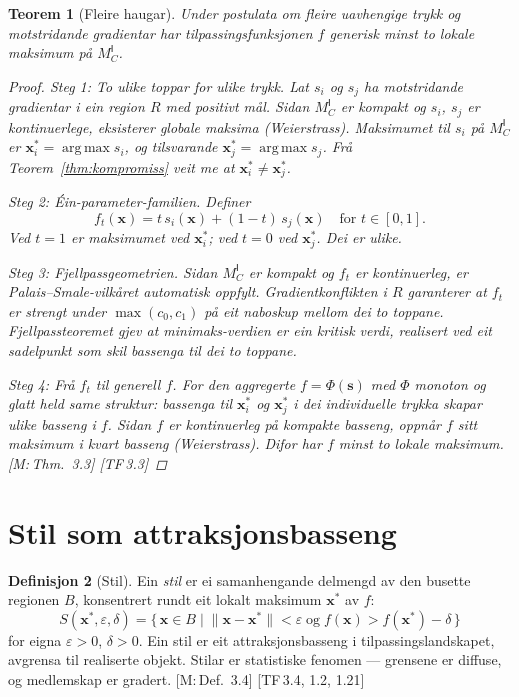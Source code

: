 \documentclass[10pt]{book}
\theoremstyle{definition}
\newtheorem{definisjon}{Definisjon}[chapter]
\theoremstyle{plain}
\newtheorem{teorem}[definisjon]{Teorem}
\theoremstyle{remark}
\newcommand{\MC}{M^{\mathsf{I}}_C}
\newcommand{\norm}[1]{\lVert #1 \rVert}
\DeclareMathOperator{\argmax}{arg\,max}
\newcommand{\TF}[1]{\textnormal{[TF\,#1]}}
\newcommand{\Mref}[1]{\textnormal{[M:\,#1]}}
\begin{document}
\begin{teorem}[Fleire haugar]\label{thm:haugar}
Under postulata om fleire uavhengige trykk og motstridande gradientar har tilpassingsfunksjonen $f$ generisk minst to lokale maksimum p\aa{} $\MC$.

\begin{proof}
\textit{Steg 1: To ulike toppar for ulike trykk.} Lat $s_i$ og $s_j$ ha motstridande gradientar i ein region $R$ med positivt m\aa l. Sidan $\MC$ er kompakt og $s_i$, $s_j$ er kontinuerlege, eksisterer globale maksima (Weierstrass). Maksimumet til $s_i$ p\aa{} $\MC$ er $\bm{x}_i^* = \argmax s_i$, og tilsvarande $\bm{x}_j^* = \argmax s_j$. Fr\aa{} Teorem~\ref{thm:kompromiss} veit me at $\bm{x}_i^* \neq \bm{x}_j^*$.

\textit{Steg 2: \'Ein-parameter-familien.} Definer
\[
  f_t(\bm{x}) = t \, s_i(\bm{x}) + (1-t) \, s_j(\bm{x}) \quad \text{for } t \in [0,1].
\]
Ved $t = 1$ er maksimumet ved $\bm{x}_i^*$; ved $t = 0$ ved $\bm{x}_j^*$. Dei er ulike.

\textit{Steg 3: Fjellpassgeometrien.} Sidan $\MC$ er kompakt og $f_t$ er kontinuerleg, er Palais--Smale-vilk\aa ret automatisk oppfylt. Gradientkonflikten i $R$ garanterer at $f_t$ er strengt under $\max(c_0, c_1)$ p\aa{} eit naboskup mellom dei to toppane. Fjellpassteoremet gjev at minimaks-verdien er ein kritisk verdi, realisert ved eit sadelpunkt som skil bassenga til dei to toppane.

\textit{Steg 4: Fr\aa{} $f_t$ til generell $f$.} For den aggregerte $f = \Phi(\bm{s})$ med $\Phi$ monoton og glatt held same struktur: bassenga til $\bm{x}_i^*$ og $\bm{x}_j^*$ i dei individuelle trykka skapar ulike basseng i $f$. Sidan $f$ er kontinuerleg p\aa{} kompakte basseng, oppn\aa r $f$ sitt maksimum i kvart basseng (Weierstrass). Difor har $f$ minst to lokale maksimum. \Mref{Thm.~3.3} \TF{3.3}
\end{proof}
\end{teorem}

\section{Stil som attraksjonsbasseng}\label{sec:landskap:stil}

\begin{definisjon}[Stil]\label{def:stil}
Ein \emph{stil} er ei samanhengande delmengd av den busette regionen $B$, konsentrert rundt eit lokalt maksimum $\bm{x}^*$ av $f$:
\[
  S(\bm{x}^*, \varepsilon, \delta) = \bigl\{\, \bm{x} \in B \;\big|\;
    \norm{\bm{x} - \bm{x}^*} < \varepsilon \;\text{og}\; f(\bm{x}) > f(\bm{x}^*) - \delta \,\bigr\}
\]
for eigna $\varepsilon > 0$, $\delta > 0$. Ein stil er eit attraksjonsbasseng i tilpassingslandskapet, avgrensa til realiserte objekt. Stilar er statistiske fenomen --- grensene er diffuse, og medlemskap er gradert. \Mref{Def.~3.4} \TF{3.4, 1.2, 1.21}
\end{definisjon}
\end{document}
